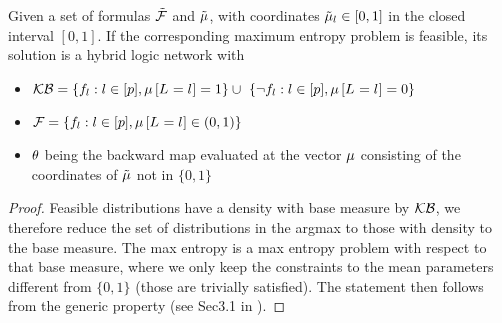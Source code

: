 \begin{theorem}
	Given a set of formulas $\tilde{\mathcal{F}}$ and $\tilde{\mu}$, with coordinates $\tilde{\mu}_l\in[0,1]$ in the closed interval $[0,1]$.
	If the corresponding maximum entropy problem is feasible, its solution is a hybrid logic network with 
	\begin{itemize}
		\item $\hardformulaset= \{\enumformula : \selindexin, \meanparamat{\indexedselvariable} = 1\} \cup  \{\lnot\enumformula : \selindexin, \meanparamat{\indexedselvariable} = 0\} $
		\item $\mathcal{F} = \{f_{l} : l\in[p], \mu\left[L_{}=l_{}\right] \in (0,1)\}$
		\item $\theta$ being the backward map evaluated at the vector $\mu$ consisting of the coordinates of $\tilde{\mu}$ not in $\{0,1\}$
	\end{itemize}
\end{theorem}
\begin{proof}
	Feasible distributions have a density with base measure by $\mathcal{KB}$, we therefore reduce the set of distributions in the argmax to those with density to the base measure.
	The max entropy is a max entropy problem with respect to that base measure, where we only keep the constraints to the mean parameters different from $\{0,1\}$ (those are trivially satisfied).
	The statement then follows from the generic property (see Sec3.1 in \cite{wainwright_graphical_2008}).
\end{proof}
















